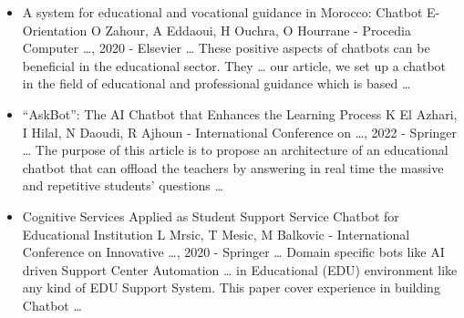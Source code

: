\documentclass[14pt]{extarticle}
\begin{document}
\begin{itemize}
    \item A system for educational and vocational guidance in Morocco: Chatbot E-Orientation
    O Zahour, A Eddaoui, H Ouchra, O Hourrane - Procedia Computer …, 2020 - Elsevier
    … These positive aspects of chatbots can be beneficial in the educational sector. They … our
    article, we set up a chatbot in the field of educational and professional guidance which is based …

    \item “AskBot”: The AI Chatbot that Enhances the Learning Process
    K El Azhari, I Hilal, N Daoudi, R Ajhoun - International Conference on …, 2022 - Springer
    … The purpose of this article is to propose an architecture of an educational chatbot that can
    offload the teachers by answering in real time the massive and repetitive students’ questions …

    \item Cognitive Services Applied as Student Support Service Chatbot for Educational Institution
    L Mrsic, T Mesic, M Balkovic - International Conference on Innovative …, 2020 - Springer
    … Domain specific bots like AI driven Support Center Automation … in Educational (EDU)
    environment like any kind of EDU Support System. This paper cover experience in building Chatbot …

\end{itemize}
\end{document}

